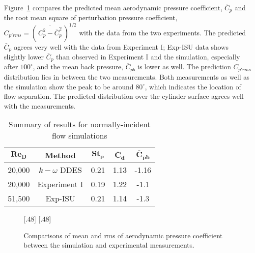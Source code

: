 Figure~\ref{fig:Cp_compared_Re20k} compares the predicted mean aerodynamic
pressure coefficient, $\overline{C}_p$ and the root mean square of perturbation
pressure coefficient, $C_{p'rms} = \left(\,\overline{C^2_p -
\overline{C}^2_p}\,\right)^{1/2}$ with the data from the two experiments. The
predicted $\overline{C}_p$ agrees very well with the data from Experiment I;
Exp-ISU data shows slightly lower $\overline{C}_p$ than observed in
Experiment I and the simulation, especially after $100^\circ$, and the mean
back pressure, $\overline{C}_{pb}$ is lower as well. The prediction
$C_{p'rms}$ distribution lies in between the two measurements. Both
measurements as well as the simulation show the peak to be around $80^\circ$,
which indicates the location of flow separation. The predicted distribution
over the cylinder surface agrees well with the measurements.
%
\begin{table}[htb!]
  \caption{Summary of results for normally-incident flow simulations} 
  \label{tab:comparisonRe20k} 
  \begin{center}
  \begin{tabular}{c|c|c|c|c}
      $\boldsymbol{Re_D}$ & \textbf{Method} & $\boldsymbol{St_p}$ & $\boldsymbol{\overline{C}_d}$ & $\boldsymbol{\overline{C}_{pb}}$ \\ \hline
      \hline
      20,000 & $k-\omega$ DDES & 0.21 & 1.13 & -1.16 \\ \hline
      20,000 & Experiment I    & 0.19 & 1.22 & -1.1  \\ \hline
      51,500 & Exp-ISU   & 0.21 & 1.14 & -1.3  \\ \hline
      \hline
  \end{tabular}
  \end{center}
\end {table}

\begin{figure}[htb!]
  \centering
    [.48\linewidth]{}
  \hspace*{\fill}
    [.48\linewidth]{}
  \caption{Comparisons of mean and rms of aerodynamic pressure coefficient
  between the simulation and experimental measurements.}
  \label{fig:Cp_compared_Re20k}
\end{figure}


